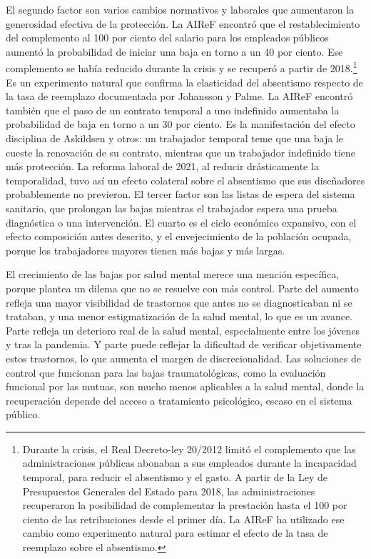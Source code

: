 \documentclass[10pt,a4paper]{article}
\begin{document}
El segundo factor son varios cambios normativos y laborales que aumentaron la generosidad efectiva de la protección. La AIReF encontró que el restablecimiento del complemento al 100 por ciento del salario para los empleados públicos aumentó la probabilidad de iniciar una baja en torno a un 40 por ciento. Ese complemento se había reducido durante la crisis y se recuperó a partir de 2018.\footnote{%
    Durante la crisis, el Real Decreto-ley 20/2012 limitó el complemento que las administraciones públicas abonaban a sus empleados durante la incapacidad temporal, para reducir el absentismo y el gasto. A partir de la Ley de Presupuestos Generales del Estado para 2018, las administraciones recuperaron la posibilidad de complementar la prestación hasta el 100 por ciento de las retribuciones desde el primer día. La AIReF ha utilizado ese cambio como experimento natural para estimar el efecto de la tasa de reemplazo sobre el absentismo.
}
Es un experimento natural que confirma la elasticidad del absentismo respecto de la tasa de reemplazo documentada por Johansson y Palme. La AIReF encontró también que el paso de un contrato temporal a uno indefinido aumentaba la probabilidad de baja en torno a un 30 por ciento. Es la manifestación del efecto disciplina de Askildsen y otros: un trabajador temporal teme que una baja le cueste la renovación de su contrato, mientras que un trabajador indefinido tiene más protección. La reforma laboral de 2021, al reducir drásticamente la temporalidad, tuvo así un efecto colateral sobre el absentismo que sus diseñadores probablemente no previeron. El tercer factor son las listas de espera del sistema sanitario, que prolongan las bajas mientras el trabajador espera una prueba diagnóstica o una intervención. El cuarto es el ciclo económico expansivo, con el efecto composición antes descrito, y el envejecimiento de la población ocupada, porque los trabajadores mayores tienen más bajas y más largas.
    
El crecimiento de las bajas por salud mental merece una mención específica, porque plantea un dilema que no se resuelve con más control. Parte del aumento refleja una mayor visibilidad de trastornos que antes no se diagnosticaban ni se trataban, y una menor estigmatización de la salud mental, lo que es un avance. Parte refleja un deterioro real de la salud mental, especialmente entre los jóvenes y tras la pandemia. Y parte puede reflejar la dificultad de verificar objetivamente estos trastornos, lo que aumenta el margen de discrecionalidad. Las soluciones de control que funcionan para las bajas traumatológicas, como la evaluación funcional por las mutuas, son mucho menos aplicables a la salud mental, donde la recuperación depende del acceso a tratamiento psicológico, escaso en el sistema público.
\end{document}
